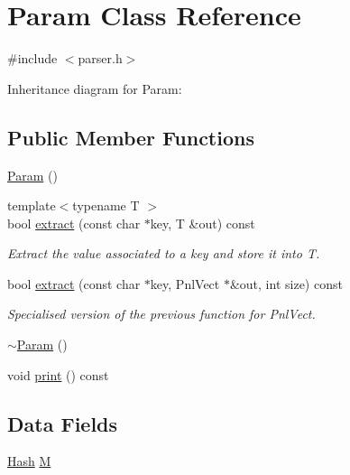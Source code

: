 \hypertarget{classParam}{\section{Param Class Reference}
\label{classParam}
}


{\ttfamily \#include $<$parser.\-h$>$}



Inheritance diagram for Param\-:
\subsection*{Public Member Functions}
\begin{DoxyCompactItemize}
\item 
\hyperlink{classParam_ae0eeef2ab32df12ccc4e9d2174d6e91a}{Param} ()
\item 
{\footnotesize template$<$typename T $>$ }\\bool \hyperlink{classParam_a1f1439c7fa41f2e5a291faa309f5faac}{extract} (const char $\ast$key, T \&out) const 
\begin{DoxyCompactList}\small\item\em Extract the value associated to a key and store it into T. \end{DoxyCompactList}\item 
bool \hyperlink{classParam_a1991bb62b5226ff19e4cb02359577c72}{extract} (const char $\ast$key, Pnl\-Vect $\ast$\&out, int size) const 
\begin{DoxyCompactList}\small\item\em Specialised version of the previous function for Pnl\-Vect. \end{DoxyCompactList}\item 
\hyperlink{classParam_a63814ed15af3910f8899dbd6853a7e05}{$\sim$\-Param} ()
\item 
void \hyperlink{classParam_a05fdfe029c450d1607e64cda216ed7ac}{print} () const 
\end{DoxyCompactItemize}
\subsection*{Data Fields}
\begin{DoxyCompactItemize}
\item 
\hyperlink{parser_8h_a806666463865555a5d7aba1d6b0b9674}{Hash} \hyperlink{classParam_ab671c1688f5247604d23ed990c90fd36}{M}
\end{DoxyCompactItemize}


